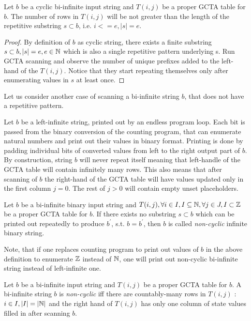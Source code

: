 \begin{corollary}Let $b$ be a cyclic bi-infinite input string and $T(i,j)$ be a proper GCTA table for $b$. The number of rows in $T(i, j)$ will be not greater than the length of the repetitive substring $s \subset b$, i.e. $i <= e, |s| = e$.\end{corollary}

\begin{proof}By definition of $b$ as cyclic string, there exists a finite substring $s \subset b, |s| = e, e \in \mathbb{N}$ which is also a single repetitive pattern underlying s. Run GCTA scanning and observe the number of unique prefixes added to the left-hand of the $T(i, j)$. Notice that they start repeating themselves only after enumerating values in $s$ at least once.\end{proof}

Let us consider another case of scanning a bi-infinite string $b$, that does not have a repetitive pattern.

Let $b$ be a left-infinite string, printed out by an endless program loop. Each bit is passed from the binary conversion of the counting program, that can enumerate natural numbers and print out their values in binary format. Printing is done by padding individual bits of converted values from left to the right output part of $b$. By construction, string $b$ will never repeat itself meaning that left-handle of the GCTA table will contain infinitely many rows. This also means that after scanning of $b$ the right-hand of the GCTA table will have values updated only in the first column $j=0$. The rest of $j > 0$ will contain empty unset placeholders.

\begin{definition}Let $b$ be a bi-infinite binary input string and $T(i,j), \forall i \in I, I \subseteq \mathbb{N}, \forall j \in J, I \subset \mathbb{Z}$ be a proper GCTA table for $b$. If there exists no substring $s \subset b$ which can be printed out repeatedly to produce $b^\prime$, s.t. $b = b^\prime$, then $b$ is called \textit{non-cyclic} infinite binary string.\end{definition}

Note, that if one replaces counting program to print out values of $b$ in the above definition to enumerate $\mathbb{Z}$ instead of $\mathbb{N}$, one will print out non-cyclic bi-infinite string instead of left-infinite one.

\begin{theorem}Let $b$ be a bi-infinite input string and $T(i,j)$ be a proper GCTA table for $b$. A bi-infinite string $b$ is \textit{non-cyclic} iff there are countably-many rows in $T(i,j)$ : $ i \in I, |I| = |\mathbb{N}|$ and the right hand of $T(i,j)$ has only one column of state values filled in after scanning $b$.\end{theorem}


